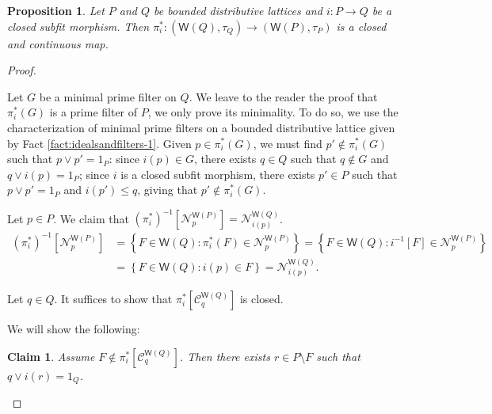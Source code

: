 \documentclass{article}
\newcommand{\opencorn}[2]{\mathcal{N}^{\mathsf{W}(#1)}_{#2}}
\newcommand{\closedcorn}[2]{\mathcal{C}^{\mathsf{W}(#1)}_{#2}}
\newcommand{\corn}[1]{(\mathsf{W}(#1),\tau_{#1})}
\theoremstyle{plain}
\newtheorem{proposition}[theorem]{Proposition}
\newtheorem{claim}{Claim}
\theoremstyle{definition}
\theoremstyle{remark}
\newcommand{\bp}[1]{\left\lbrace #1 \right\rbrace}
\newcommand{\0}{\mathbbm 0}
\newcommand{\1}{\mathbbm 1}
\newcommand{\2}{\mathbbm 2}
\begin{document}
\begin{proposition}
\label{prop:pi_map}
    Let  $P$ and $Q$ be bounded distributive  lattices and $i: P\to Q$ be a closed subfit morphism. Then $\pi^*_i: \corn{Q}\to \corn{P}$ is a closed and continuous map.
\end{proposition}



\begin{proof} $ $

    \begin{description}[font=\normalfont\itshape]
  
  \item[$\pi^*_i$ is well defined.] 
  Let $G $ be a minimal prime filter on $Q$. We leave to the reader the proof that $\pi^*_i(G)$ is a prime filter of $P$,  we only prove its minimality.  To do so, we use the characterization of minimal prime filters on a bounded distributive lattice given by Fact \ref{fact:idealsandfilters-1}. Given $p \in \pi^*_i(G) $, we must find $p'\not\in\pi^*_i(G) $ such that $p\vee p'=1_P$: since $i(p)\in G$, there exists $q \in Q$ such that $q \notin G$ and $q \vee i(p) =1_P$; since $i$ is a closed subfit morphism, there exists $p' \in P$ such that $p \vee p' =1_P$ and $i(p') \leq q$, giving that $p' \notin \pi^*_i(G)$. 
  
  
 
  \item[$\pi^*_i$ is continuous.] Let $p \in P$. We claim that $(\pi^*_i)^{-1}[\opencorn{P}{p}]=\opencorn{Q}{i(p)}$. 
  \begin{align*}
       (\pi^*_i)^{-1}[\opencorn{P}{p}]&=\bp{F \in \mathsf{W}(Q):\pi^*_i(F) \in \opencorn{P}{p} }=\bp{F \in \mathsf{W}(Q):i^{-1}[F] \in \opencorn{P}{p} }\\&=\bp{F \in \mathsf{W}(Q): i(p) \in F}=\opencorn{Q}{i(p)}.
  \end{align*}


 \item[$\pi^*_i$ is closed.]   Let $q \in Q$. It suffices to show that $\pi^*_i[\closedcorn{Q}{q}]$ is closed. 


We will show the following:
\begin{claim}
\label{claim-closed}
Assume $F\not\in \pi^*_i[\closedcorn{Q}{q}]$.
Then there exists $r \in P \setminus F$ such that $q \vee  i(r)=1_Q$.
\end{claim}



\end{description}
\end{proof}
\end{document}
